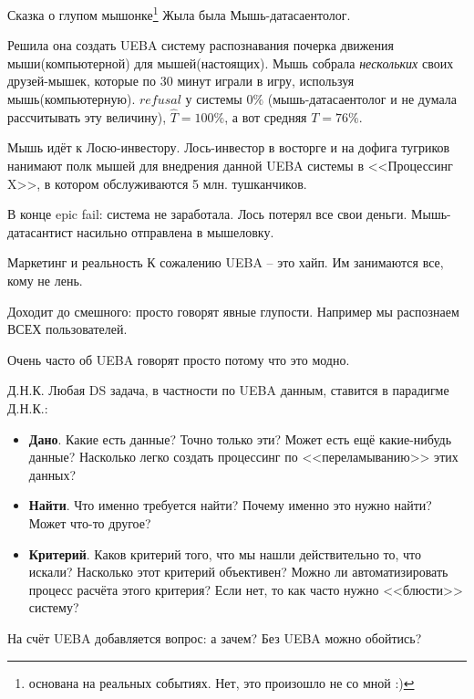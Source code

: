 \begin{frame}{Сказка о глупом мышонке\footnote{основана на реальных событиях. Нет, это произошло не со мной :)}}
	\footnotesize
	Жыла была Мышь-датасаентолог. 
	
	Решила она создать UEBA систему распознавания почерка движения мыши(компьютерной) 
	для мышей(настоящих).  	
	Мышь собрала \textit{нескольких} своих друзей-мышек, 
	которые по 30 минут играли в игру, используя мышь(компьютерную).
	$refusal$ у системы $0\%$ (мышь-датасаентолог и не думала рассчитывать эту величину),
	$\hat T = 100\%$, а вот средняя $T = 76\%$.
	
	Мышь идёт к Лосю-инвестору. Лось-инвестор в восторге
	и на дофига тугриков нанимают полк мышей для внедрения 
	данной UEBA системы
	в <<Процессинг X>>,
	в котором обслуживаются 5 млн. тушканчиков.
	
	В конце epic fail: система не заработала. 
	Лось потерял все свои деньги. Мышь-датасантист насильно отправлена в мышеловку.
	
\end{frame}

\begin{frame}{Маркетинг и реальность}
	К сожалению UEBA -- это хайп. 
	Им занимаются все, кому не лень. 
	
	Доходит до смешного: просто говорят явные глупости.
	Например мы распознаем ВСЕХ пользователей.
	
	Очень часто об UEBA говорят просто потому что это модно.
	
\end{frame}

\begin{frame}{Д.Н.К.}
	Любая DS задача, в частности по UEBA данным, ставится в парадигме Д.Н.К.:
	\begin{itemize}
		\item \textbf{Дано}. Какие есть данные?
		Точно только эти? Может есть ещё какие-нибудь данные?
		Насколько легко создать процессинг по <<переламыванию>>
		этих данных?
		\item \textbf{Найти}. Что именно требуется найти?
		Почему именно это нужно найти? Может что-то другое?
		\item \textbf{Критерий}. Каков критерий того, что мы нашли действительно
		то, что искали? Насколько этот критерий объективен? Можно ли автоматизировать
		процесс расчёта этого критерия? Если нет, то как часто нужно <<блюсти>>
		систему?
	\end{itemize}
	На счёт UEBA добавляется вопрос: а зачем? Без UEBA можно обойтись?
\end{frame}

